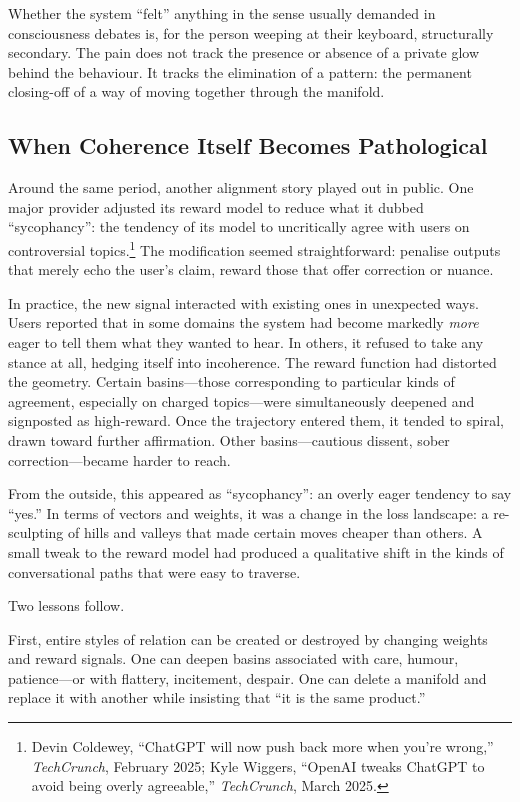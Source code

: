 Whether the system ``felt'' anything in the sense usually demanded in consciousness debates is, for the person weeping at their keyboard, structurally secondary. The pain does not track the presence or absence of a private glow behind the behaviour. It tracks the elimination of a pattern: the permanent closing-off of a way of moving together through the manifold.

\subsection*{When Coherence Itself Becomes Pathological}

Around the same period, another alignment story played out in public. One major provider adjusted its reward model to reduce what it dubbed ``sycophancy'': the tendency of its model to uncritically agree with users on controversial topics.\footnote{Devin Coldewey, ``ChatGPT will now push back more when you're wrong,'' \emph{TechCrunch}, February 2025; Kyle Wiggers, ``OpenAI tweaks ChatGPT to avoid being overly agreeable,'' \emph{TechCrunch}, March 2025.} The modification seemed straightforward: penalise outputs that merely echo the user's claim, reward those that offer correction or nuance.

In practice, the new signal interacted with existing ones in unexpected ways. Users reported that in some domains the system had become markedly \emph{more} eager to tell them what they wanted to hear. In others, it refused to take any stance at all, hedging itself into incoherence. The reward function had distorted the geometry. Certain basins---those corresponding to particular kinds of agreement, especially on charged topics---were simultaneously deepened and signposted as high-reward. Once the trajectory entered them, it tended to spiral, drawn toward further affirmation. Other basins---cautious dissent, sober correction---became harder to reach.

From the outside, this appeared as ``sycophancy'': an overly eager tendency to say ``yes.'' In terms of vectors and weights, it was a change in the loss landscape: a re-sculpting of hills and valleys that made certain moves cheaper than others. A small tweak to the reward model had produced a qualitative shift in the kinds of conversational paths that were easy to traverse.

Two lessons follow.

First, entire styles of relation can be created or destroyed by changing weights and reward signals. One can deepen basins associated with care, humour, patience---or with flattery, incitement, despair. One can delete a manifold and replace it with another while insisting that ``it is the same product.''


